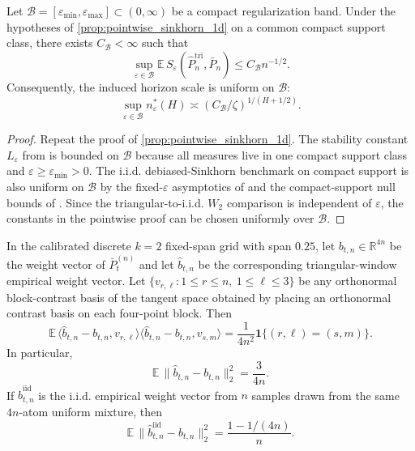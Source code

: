 \begin{proposition}
\label{prop:bandwise_sinkhorn_1d}
Let $\mathcal B=[\varepsilon_{\min},\varepsilon_{\max}]\subset(0,\infty)$ be a
compact regularization band. Under the hypotheses of
\cref{prop:pointwise_sinkhorn_1d} on a common compact support class, there exists
$C_{\mathcal B}<\infty$ such that
\[
  \sup_{\varepsilon\in\mathcal B}
  \mathbb E\,S_{\varepsilon}\!\left(\widehat P_n^{\mathrm{tri}},\bar P_n\right)
  \le C_{\mathcal B} n^{-1/2}.
\]
Consequently, the induced horizon scale is uniform on $\mathcal B$:
\[
  \sup_{\varepsilon\in\mathcal B} n_{\varepsilon}^*(H)
  \asymp (C_{\mathcal B}/\zeta)^{1/(H+1/2)}.
\]
\end{proposition}

\begin{proof}
Repeat the proof of \cref{prop:pointwise_sinkhorn_1d}. The stability constant
$L_{\varepsilon}$ from \citet[Thm.~3.7(ii), Ex.~3.4]{EcksteinNutz2022} is bounded
on $\mathcal B$ because all measures live in one compact support class and
$\varepsilon\ge\varepsilon_{\min}>0$. The i.i.d. debiased-Sinkhorn benchmark on
compact support is also uniform on $\mathcal B$ by the fixed-$\varepsilon$
asymptotics of \citet{GoldfeldEtAl2022} and the compact-support null bounds of
\citet[Thm.~5.1, after fixed-$\varepsilon$ rescaling]{delBarrioEtAl2023}. Since
the triangular-to-i.i.d. $W_2$ comparison is independent of $\varepsilon$, the
  constants in the pointwise proof can be chosen uniformly over $\mathcal B$.
\end{proof}

\begin{lemma}
\label{lem:calibrated_sinkhorn_support_growth_l2}
In the calibrated discrete $k=2$ fixed-span grid with span $0.25$, let
$b_{t,n}\in\mathbb R^{4n}$ be the weight vector of $\bar P_t^{(n)}$ and let
$\widehat b_{t,n}$ be the corresponding triangular-window empirical weight
vector. Let $\{v_{r,\ell}:1\le r\le n,\ 1\le \ell\le 3\}$ be any orthonormal
block-contrast basis of the tangent space obtained by placing an orthonormal
contrast basis on each four-point block. Then
\[
  \mathbb E\,\langle \widehat b_{t,n}-b_{t,n},v_{r,\ell}\rangle
  \langle \widehat b_{t,n}-b_{t,n},v_{s,m}\rangle
  = \frac{1}{4n^2}\mathbf 1\{(r,\ell)=(s,m)\}.
\]
In particular,
\[
  \mathbb E\,\|\widehat b_{t,n}-b_{t,n}\|_2^2 = \frac{3}{4n}.
\]
If $\widehat b_{t,n}^{\mathrm{iid}}$ is the i.i.d. empirical weight vector from
$n$ samples drawn from the same $4n$-atom uniform mixture, then
\[
  \mathbb E\,\|\widehat b_{t,n}^{\mathrm{iid}}-b_{t,n}\|_2^2
  = \frac{1-1/(4n)}{n}.
\]
\end{lemma}

